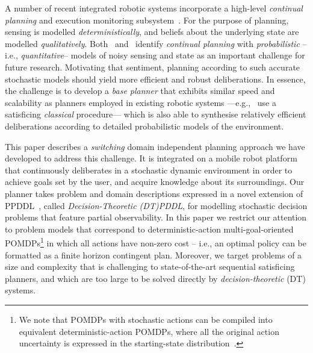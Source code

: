 



A number of recent integrated robotic systems incorporate a
high-level {\em continual planning} and execution monitoring
subsystem~\cite{wyattetal2010tamd,talamadupula:2010,Kraft2008}.
For the purpose of planning, sensing is modelled {\em
deterministically}, and beliefs about the underlying state are
modelled {\em qualitatively}.
Both~\citeauthor{talamadupula:2010} and~\citeauthor{wyattetal2010tamd}
identify
\emph{continual planning} with {\em probabilistic} --i.e., {\em quantitative}--
models of noisy sensing and state as an important challenge for future
research.
Motivating that sentiment, planning according to such accurate
stochastic models should yield more efficient and robust
deliberations.
In essence, the challenge is to develop a {\em base planner} that
exhibits similar speed and scalability as planners employed in
existing robotic systems ---e.g.,~\citeauthor{wyattetal2010tamd} use a
satisficing {\em classical} procedure--- which is also able to
synthesise relatively efficient deliberations according to detailed
probabilistic models of the environment.


This paper describes a {\em switching} domain independent planning
approach we have developed to address this challenge. It is
integrated on a mobile robot platform that continuously deliberates
in a stochastic dynamic environment in order to achieve goals set by
the user, and acquire knowledge about its surroundings.
Our planner takes problem and domain descriptions expressed in a novel
extension of PPDDL~\cite{younes:etal:2005}, called {\em
Decision-Theoretic (DT)PDDL}, for modelling stochastic decision
problems that feature partial observability.  In this paper we
restrict our attention to problem models that correspond to
deterministic-action multi-goal-oriented POMDPs\footnote{We note that
POMDPs with stochastic actions can be compiled into equivalent
deterministic-action POMDPs, where all the original action uncertainty
is expressed in the starting-state
distribution~\cite{ng:Jordan:2000}.} in which all actions have
non-zero cost -- i.e., an optimal policy can be formatted as a finite
horizon contingent plan. Moreover, we target problems of a size and
complexity that is challenging to state-of-the-art sequential
satisficing planners, and which are too large to be solved directly by
{\em decision-theoretic} (DT) systems.

